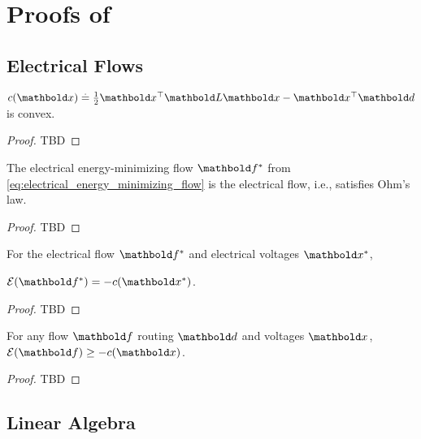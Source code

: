 
\chapter{Proofs of }

\section{Electrical Flows}

\begin{lem}\label{lem:a1}
$c(\vx) \defeq \frac{1}{2}\trans{\vx}\mL\vx - \trans{\vx}\vd$ is convex.
\end{lem}
\begin{proof} TBD
\end{proof}

\begin{lem}\label{lem:a2}
The electrical energy-minimizing flow $\s{\vf}$ from \cref{eq:electrical_energy_minimizing_flow} is the electrical flow, i.e., satisfies Ohm's law.
\end{lem}
\begin{proof} TBD
\end{proof}

\begin{lem}\label{lem:a3}
For the electrical flow $\s{\vf}$ and electrical voltages $\s{\vx}$,\par\noindent $\mathcal{E}(\s{\vf}) = -c(\s{\vx})$.
\end{lem}
\begin{proof} TBD
\end{proof}

\begin{lem}\label{lem:a4}
For any flow $\vf$ routing $\vd$ and voltages $\vx$, $\mathcal{E}(\vf) \geq -c(\vx)$.
\end{lem}
\begin{proof} TBD
\end{proof}

\section{Linear Algebra}


